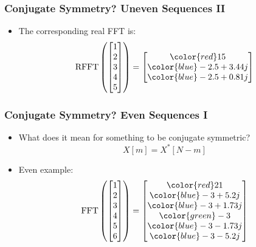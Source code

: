 \documentclass{beamer}
\begin{document}
\begin{frame}
\frametitle{Conjugate Symmetry? Uneven Sequences II}
\begin{itemize}
    \item The corresponding real FFT is:
        \begin{equation}
        \textrm{RFFT}\left(\begin{bmatrix}1 \\ 2 \\ 3 \\ 4 \\ 5 \end{bmatrix}\right) = 
        \begin{bmatrix}
           {\color{red}15} \\ {\color{blue}-2.5+3.44j} \\ {\color{blue}-2.5+0.81j} 
        \end{bmatrix}
        \end{equation}
\end{itemize}
\end{frame}

\begin{frame}
\frametitle{Conjugate Symmetry? Even Sequences I}
\begin{itemize}
    \item What does it mean for something to be conjugate symmetric?
    \begin{equation*}
        X[m] = X^*[N - m] 
    \end{equation*}
    \item Even example:
        \begin{equation}
        \textrm{FFT}\left(\begin{bmatrix}1 \\ 2 \\ 3 \\ 4 \\ 5 \\ 6 \end{bmatrix}\right) = 
        \begin{bmatrix}
           {\color{red}21} \\ {\color{blue}-3+5.2j} \\ {\color{blue}-3+1.73j} \\
           {\color{green}-3} \\ {\color{blue}-3 -1.73j} \\ {\color{blue}-3 -5.2j}
        \end{bmatrix}
        \end{equation}
\end{itemize}
\end{frame}
\end{document}
